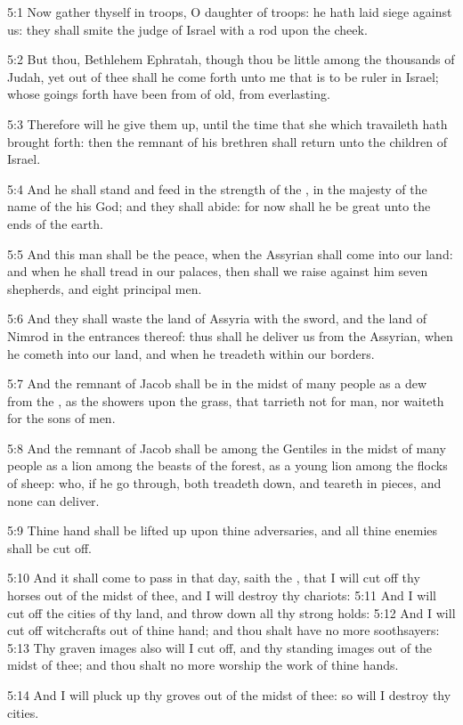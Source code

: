 5:1 Now gather thyself in troops, O daughter of troops: he hath laid siege against us: they shall smite the judge of Israel with a rod upon the cheek.

5:2 But thou, Bethlehem Ephratah, though thou be little among the thousands of Judah, yet out of thee shall he come forth unto me that is to be ruler in Israel; whose goings forth have been from of old, from everlasting.

5:3 Therefore will he give them up, until the time that she which travaileth hath brought forth: then the remnant of his brethren shall return unto the children of Israel.

5:4 And he shall stand and feed in the strength of the \LORD, in the majesty of the name of the \LORD his God; and they shall abide: for now shall he be great unto the ends of the earth.

5:5 And this man shall be the peace, when the Assyrian shall come into our land: and when he shall tread in our palaces, then shall we raise against him seven shepherds, and eight principal men.

5:6 And they shall waste the land of Assyria with the sword, and the land of Nimrod in the entrances thereof: thus shall he deliver us from the Assyrian, when he cometh into our land, and when he treadeth within our borders.

5:7 And the remnant of Jacob shall be in the midst of many people as a dew from the \LORD, as the showers upon the grass, that tarrieth not for man, nor waiteth for the sons of men.

5:8 And the remnant of Jacob shall be among the Gentiles in the midst of many people as a lion among the beasts of the forest, as a young lion among the flocks of sheep: who, if he go through, both treadeth down, and teareth in pieces, and none can deliver.

5:9 Thine hand shall be lifted up upon thine adversaries, and all thine enemies shall be cut off.

5:10 And it shall come to pass in that day, saith the \LORD, that I will cut off thy horses out of the midst of thee, and I will destroy thy chariots: 5:11 And I will cut off the cities of thy land, and throw down all thy strong holds: 5:12 And I will cut off witchcrafts out of thine hand; and thou shalt have no more soothsayers: 5:13 Thy graven images also will I cut off, and thy standing images out of the midst of thee; and thou shalt no more worship the work of thine hands.

5:14 And I will pluck up thy groves out of the midst of thee: so will I destroy thy cities.

